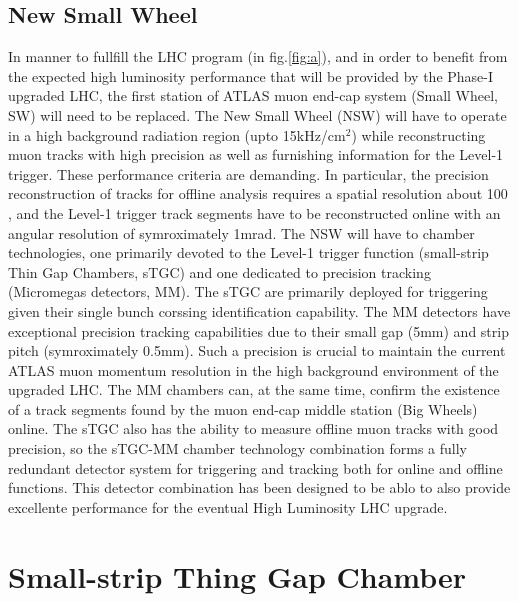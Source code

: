 \subsection{New Small Wheel}

In manner to fullfill the LHC program (in fig.\ref{fig:a}), and in order to benefit from the expected high luminosity performance that will be provided by the
Phase-I upgraded LHC, the first station of ATLAS muon end-cap system (Small Wheel, SW) will need to be replaced.  The New Small Wheel (NSW) will have to operate
in a high background radiation region (upto 15kHz/cm$^2$) while reconstructing muon tracks with high precision as well as furnishing information for the Level-1
trigger. These performance criteria are demanding. In particular, the precision reconstruction of tracks for offline analysis requires a spatial resolution
about 100 , and the Level-1 trigger track segments have to be reconstructed online with an angular resolution of symroximately 1mrad. The NSW will have
to chamber technologies, one primarily devoted to the Level-1 trigger function (small-strip Thin Gap Chambers, sTGC) and one dedicated to precision tracking
(Micromegas detectors, MM). The sTGC are primarily deployed for triggering given their single bunch corssing identification capability. The MM detectors have
exceptional precision tracking capabilities due to their small gap (5mm) and strip pitch (symroximately 0.5mm). Such a precision is crucial to maintain the
current ATLAS muon momentum resolution in the high background environment of the upgraded LHC. The MM chambers can, at the same time, confirm the existence of a
track segments found by the muon end-cap middle station (Big Wheels) online. The sTGC also has the ability to measure offline muon tracks with good precision,
so the sTGC-MM chamber technology combination forms a fully redundant detector system for triggering and tracking both for online and offline functions. This
detector combination has been designed to be ablo to also provide excellente performance for the eventual High Luminosity LHC upgrade.\par 



\section{Small-strip Thing Gap Chamber}


